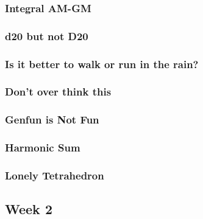 \documentclass[titlepage=true]{scrartcl}
\begin{document}
        \subsubsection{Integral AM-GM}
        \label{11.1.1}
        
        \newpage

        \subsubsection{d20 but not D20}
        \label{11.1.2}
        
        \newpage

        \subsubsection{Is it better to walk or run in the rain?}
        \label{11.1.3}
        
        \newpage

        \subsubsection{Don't over think this}
        \label{11.1.4}
        
        \newpage
        
        \subsubsection{Genfun is Not Fun}
        \label{11.1.5}
        
        \newpage

        \subsubsection{Harmonic Sum}
        \label{11.1.6}
        
        \newpage

        \subsubsection{Lonely Tetrahedron}
        \label{11.1.7}
        
        \newpage

    \subsection{Week 2}
\end{document}
